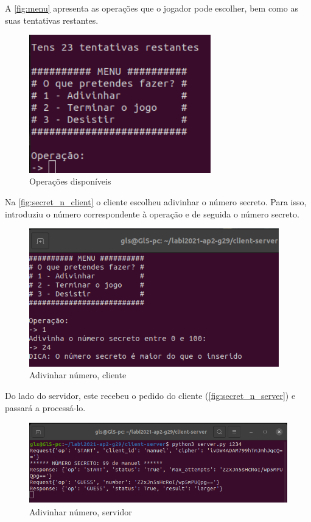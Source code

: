 \documentclass{report}
\begin{document}
A \autoref{fig:menu} apresenta as operações que o jogador pode escolher, bem como as suas tentativas restantes.

\begin{figure}[!h]
\center 
\includegraphics[height=170pt]{img/fotos_resultado/menu.png}
\caption{Operações disponíveis}
\label{fig:menu}
\end{figure}

Na \autoref{fig:secret_n_client} o cliente escolheu adivinhar o número secreto. Para isso, introduziu o número correspondente à operação e de seguida o número secreto.

\begin{figure}[!h]
\center 
\includegraphics[height=170pt]{img/fotos_resultado/guess_client.png}
\caption{Adivinhar número, cliente}
\label{fig:secret_n_client}
\end{figure}

Do lado do servidor, este recebeu o pedido do cliente (\autoref{fig:secret_n_server}) e passará a processá-lo.

\begin{figure}[!h]
\center 
\includegraphics[height=100pt]{img/fotos_resultado/guess_server.png}
\caption{Adivinhar número, servidor}
\label{fig:secret_n_server}
\end{figure}
\end{document}
